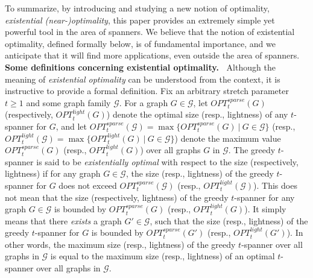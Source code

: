 \documentclass[11pt,letterpaper]{article}
\begin{document}
To summarize, by introducing and studying a new notion of optimality, \emph{existential (near-)optimality},
this paper provides an extremely simple yet powerful tool in the area of spanners.
We believe that the notion of existential optimality, defined formally below, is of fundamental importance, and we anticipate that it will find more applications, even outside the area of spanners.
\vspace{7pt}
\\
\noindent
{\bf Some definitions concerning existential optimality.~}
Although the meaning of \emph{existential optimality} can be   understood from the context, it is instructive to provide a formal definition.
Fix an arbitrary stretch parameter $t \ge 1$ and some graph family $\mathcal{G}$.
For a graph $G \in \mathcal{G}$, let $OPT^{sparse}_t(G)$ (respectively, $OPT^{light}_t(G)$)
denote the optimal size (resp., lightness) of any $t$-spanner for $G$,
and let $OPT^{sparse}_t(\mathcal{G}) = \max\{OPT^{sparse}_t(G) ~\vert~ G \in \mathcal{G}\}$
(resp., $OPT^{light}_t(\mathcal{G}) = \max\{OPT^{light}_t(G) ~\vert~ G \in \mathcal{G}\}$)
denote the maximum value $OPT^{sparse}_t(G)$ (resp., $OPT^{light}_t(G)$) over all graphs $G$ in $\mathcal{G}$.
The greedy $t$-spanner is said to be \emph{existentially optimal} with respect to the size (respectively, lightness) if
for any graph $G \in \mathcal{G}$, the size (resp., lightness) of the greedy $t$-spanner for $G$ does not exceed $OPT^{sparse}_t(\mathcal{G})$  (resp., $OPT^{light}_t(\mathcal{G})$).
This does not mean that the size (respectively, lightness) of the greedy  $t$-spanner
for any graph $G \in \mathcal{G}$ is bounded by $OPT^{sparse}_t(G)$ (resp., $OPT^{light}_t(G)$).
It simply means that there \emph{exists} a graph $G' \in \mathcal{G}$,
such that the size (resp., lightness) of the greedy $t$-spanner for $G$ is bounded by $OPT^{sparse}_t(G')$ (resp., $OPT^{light}_t(G')$).
In other words, the maximum size (resp., lightness) of the greedy $t$-spanner over all graphs in $\mathcal G$
is equal to the maximum size (resp., lightness) of an optimal $t$-spanner over all graphs in $\mathcal G$.
\end{document}
